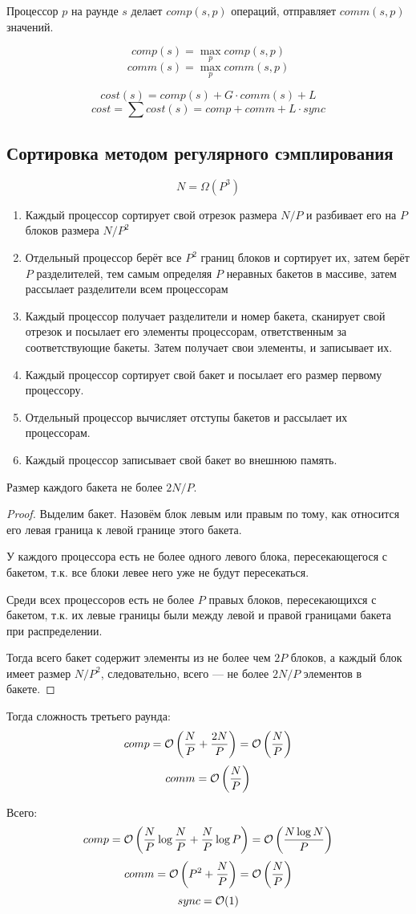 Процессор $p$ на раунде $s$
делает $comp(s, p)$ операций,
отправляет $comm(s, p)$ значений.

\[ comp(s) = \max_p comp(s, p) \]
\[ comm(s) = \max_p comm(s, p) \]

\[ cost(s) = comp(s) + G \cdot comm(s) + L \]
\[ cost = \sum cost(s) = comp + comm + L \cdot sync \]

\subsection{Сортировка методом регулярного сэмплирования}
\[ N = \Omega(P^3) \]

\begin{enumerate}
    \item Каждый процессор сортирует свой отрезок размера $N / P$
    и разбивает его на $P$ блоков размера $N / P^2$
    \item Отдельный процессор берёт все
    $P^2$ границ блоков и сортирует их,
    затем берёт $P$ разделителей, тем самым определяя
    $P$ неравных бакетов в массиве,
    затем рассылает разделители всем процессорам
    \item Каждый процессор получает разделители
    и номер бакета, сканирует свой отрезок
    и посылает его элементы процессорам, ответственным
    за соответствующие бакеты.
    Затем получает свои элементы, и записывает их.
    \item Каждый процессор сортирует свой бакет
    и посылает его размер первому процессору.
    \item Отдельный процессор вычисляет
    отступы бакетов и рассылает их процессорам.
    \item Каждый процессор записывает свой бакет
    во внешнюю память.
\end{enumerate}

\begin{theorem}
    Размер каждого бакета не более $2N / P$.
\end{theorem}
\begin{proof}
    Выделим бакет.
    Назовём блок левым или правым по тому,
    как относится его левая граница к
    левой границе этого бакета.

    У каждого процессора есть не более одного левого блока,
    пересекающегося с бакетом, т.к. все блоки левее него
    уже не будут пересекаться.

    Среди всех процессоров есть не более $P$
    правых блоков, пересекающихся с бакетом,
    т.к. их левые границы были между левой
    и правой границами бакета при распределении.

    Тогда всего бакет содержит элементы
    из не более чем $2P$ блоков,
    а каждый блок имеет размер $N / P^2$,
    следовательно, всего
    --- не более $2N / P$ элементов в бакете.
\end{proof}

Тогда сложность третьего раунда:
\[
    comp
    = \mathcal{O} \left( \frac{N}{P} + \frac{2N}{P} \right)
    = \mathcal{O} \left( \frac{N}{P} \right)
\]
\[
    comm
    = \mathcal{O} \left( \frac{N}{P} \right)
\]

Всего:
\[
    comp
    = \mathcal{O} \left( \frac{N}{P} \log \frac{N}{P} + \frac{N}{P} \log P \right)
    = \mathcal{O} \left( \frac{N \log N}{P} \right)
\]
\[
    comm
    = \mathcal{O} \left( P^2 + \frac{N}{P} \right)
    = \mathcal{O} \left( \frac{N}{P} \right)
\]
\[ sync = \mathcal{O}(1) \]

